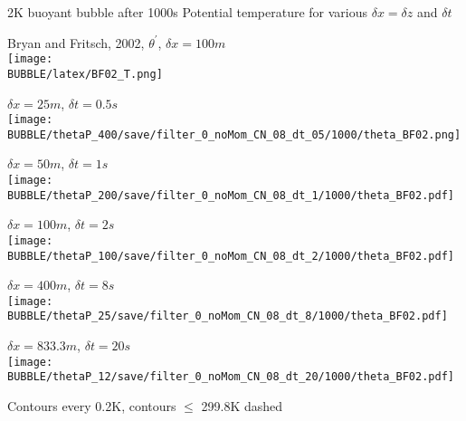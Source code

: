 \begin{slide}
{
    2K buoyant bubble after 1000s
    \normalsize\normalfont
    Potential temperature for various $\delta x = \delta z$ and $\delta t$
}
\renewcommand{\figWidth}{0.32\linewidth}

\begin{minipage}{\figWidth}\centering
Bryan and Fritsch, 2002, $\theta^\prime$, $\delta x = 100m$ \\
\texttt{[image: \\BUBBLE/latex/BF02\_T.png]}
\end{minipage}
%
\begin{minipage}{\figWidth}\centering
$\delta x = 25m$, $\delta t = 0.5s$ \\
\texttt{[image: \\BUBBLE/thetaP\_400/save/filter\_0\_noMom\_CN\_08\_dt\_05/1000/theta\_BF02.png]}
\end{minipage}
%
\begin{minipage}{\figWidth}\centering
$\delta x = 50m$, $\delta t = 1s$ \\
\texttt{[image: \\BUBBLE/thetaP\_200/save/filter\_0\_noMom\_CN\_08\_dt\_1/1000/theta\_BF02.pdf]}
\end{minipage}

\begin{minipage}{\figWidth}\centering
$\delta x = 100m$, $\delta t = 2s$ \\
\texttt{[image: \\BUBBLE/thetaP\_100/save/filter\_0\_noMom\_CN\_08\_dt\_2/1000/theta\_BF02.pdf]}
\end{minipage}
%
\begin{minipage}{\figWidth}\centering
$\delta x = 400m$, $\delta t = 8s$ \\
\texttt{[image: \\BUBBLE/thetaP\_25/save/filter\_0\_noMom\_CN\_08\_dt\_8/1000/theta\_BF02.pdf]}
\end{minipage}
%
\begin{minipage}{\figWidth}\centering
$\delta x = 833.3m$, $\delta t = 20s$ \\
\texttt{[image: \\BUBBLE/thetaP\_12/save/filter\_0\_noMom\_CN\_08\_dt\_20/1000/theta\_BF02.pdf]}
\end{minipage}


Contours every 0.2K, contours $\le$ 299.8K dashed

\end{slide}

